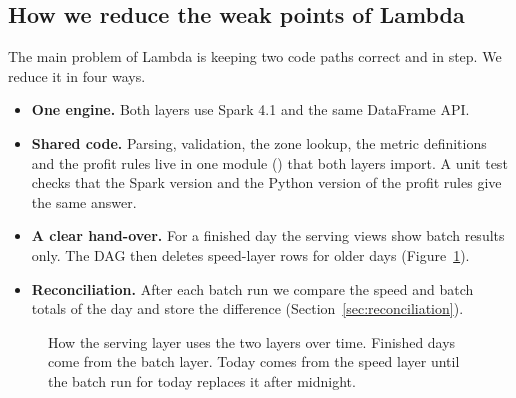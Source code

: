\subsection{How we reduce the weak points of Lambda}
The main problem of Lambda is keeping two code paths correct and in step. We reduce it in four ways.
\begin{itemize}
\item \textbf{One engine.} Both layers use Spark 4.1 and the same DataFrame API.
\item \textbf{Shared code.} Parsing, validation, the zone lookup, the metric definitions and the profit rules
live in one module () that both layers import. A unit test checks that the Spark
version and the Python version of the profit rules give the same answer.
\item \textbf{A clear hand-over.} For a finished day the serving views show batch results only. The DAG then
deletes speed-layer rows for older days (Figure~\ref{fig:handover}).
\item \textbf{Reconciliation.} After each batch run we compare the speed and batch totals of the day and store
the difference (Section~\ref{sec:reconciliation}).
\end{itemize}

\begin{figure}[!htb]
\centering

\caption{How the serving layer uses the two layers over time. Finished days come from the batch layer.
Today comes from the speed layer until the batch run for today replaces it after midnight.}
\label{fig:handover}
\end{figure}
